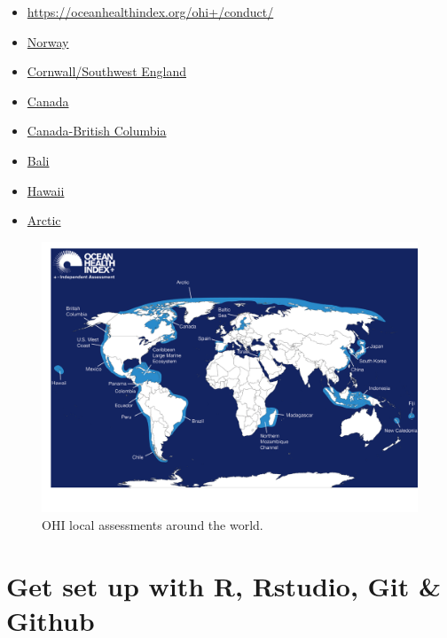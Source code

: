 \documentclass[
]{book}
\providecommand{\tightlist}{%
  \setlength{\itemsep}{0pt}\setlength{\parskip}{0pt}}
\begin{document}
\begin{itemize}
\tightlist
\item
  \url{https://oceanhealthindex.org/ohi+/conduct/}
\item
  \href{https://github.com/OHI-Norway/}{Norway}
\item
  \href{https://www.ohi.sustainable-seas.org/}{Cornwall/Southwest England}
\item
  \href{https://github.com/OHI-Science/ohi-canada}{Canada}
\item
  \href{https://github.com/OHI-Science/ohibc}{Canada-British Columbia}
\item
  \href{http://ohi-science.org/bali/}{Bali}
\item
  \href{http://ohi-science.org/mhi/}{Hawaii}
\item
  \href{https://github.com/OHI-Science/arc}{Arctic}
\end{itemize}

\begin{figure}

{\centering \includegraphics[width=800px]{_book/_main_files/figure-html/ohi+_map} 

}

\caption{OHI local assessments around the world.}\label{fig:unnamed-chunk-3}
\end{figure}

\hypertarget{get-set-up-with-r-rstudio-git-github}{%
\chapter{Get set up with R, Rstudio, Git \& Github}\label{get-set-up-with-r-rstudio-git-github}}
\end{document}
